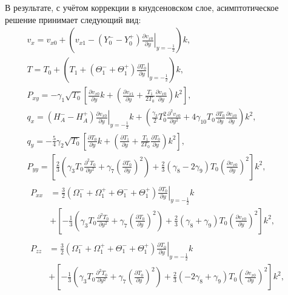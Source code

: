 \documentclass[a4paper,12pt]{article}
\newcommand{\pder}[2][]{\frac{\partial#1}{\partial#2}}
\newcommand{\pderdual}[2][]{\frac{\partial^2#1}{\partial#2^2}}
\begin{document}
В результате, с учётом коррекции в кнудсеновском слое, асимптотическое решение принимает следующий вид:
\begin{gather}
    v_x = v_{x0} + \left(v_{x1} - (Y_0^--Y_0^+)\left.\pder[v_{x0}]{y}\right|_{y=-\frac12}\right)k, \label{eq:Hilbert_U}\\
    T = T_0 + \left(T_1 + (\Theta_1^-+\Theta_1^+)\left.\pder[T_0]{y}\right|_{y=-\frac12}\right)k, \label{eq:Hilbert_T}\\
    P_{xy} = -\gamma_1\sqrt{T_0}\left[\pder[v_{x0}]{y}k + \left(\pder[v_{x1}]{y} + \frac{T_1}{2T_0}\pder[v_{x0}]{y}\right)k^2 \right], \label{eq:Hilbert_Pxy}\\
    q_x = (H_A^--H_A^+)\left.\pder[v_{x0}]{y}\right|_{y=-\frac12}k + \left(\frac{\gamma_3}2 T_0^2 \pderdual[v_{x0}]{y}
        + 4\gamma_{10} T_0 \pder[T_0]{y}\pder[v_{x0}]{y}\right)k^2, \label{eq:Hilbert_Qx}\\
    q_y = -\frac54\gamma_2\sqrt{T_0}\left[\pder[T_0]{y}k + \left(\pder[T_1]{y} + \frac{T_1}{2T_0}\pder[T_0]{y}\right)k^2 \right], \label{eq:Hilbert_Qy}\\
    P_{yy} = \left[\frac23\left(\gamma_3 T_0 \pderdual[T_0]{y} + \gamma_7\left(\pder[T_0]{y}\right)^2\right)
        + \frac23(\gamma_8-2\gamma_9)T_0\left(\pder[v_{x0}]{y}\right)^2\right]k^2, \label{eq:Hilbert_Pyy}\\
    \begin{aligned}
    P_{xx} &= \frac32 (\Omega_1^-+\Omega_1^+ + \Theta_1^-+\Theta_1^+)\left.\pder[T_0]{y}\right|_{y=-\frac12}k \\
        &+ \left[-\frac13\left(\gamma_3 T_0 \pderdual[T_0]{y} + \gamma_7\left(\pder[T_0]{y}\right)^2\right)
        + \frac23(\gamma_8+\gamma_9)T_0\left(\pder[v_{x0}]{y}\right)^2\right]k^2,
    \end{aligned}\label{eq:Hilbert_Pxx}\\
    \begin{aligned}
    P_{zz} &= \frac32 (\Omega_1^-+\Omega_1^+ + \Theta_1^-+\Theta_1^+)\left.\pder[T_0]{y}\right|_{y=-\frac12}k \\
        &+ \left[-\frac13\left(\gamma_3 T_0 \pderdual[T_0]{y} + \gamma_7\left(\pder[T_0]{y}\right)^2\right)
        + \frac23(-2\gamma_8+\gamma_9)T_0\left(\pder[v_{x0}]{y}\right)^2\right]k^2,
    \end{aligned}\label{eq:Hilbert_Pzz}
\end{gather}
\end{document}
